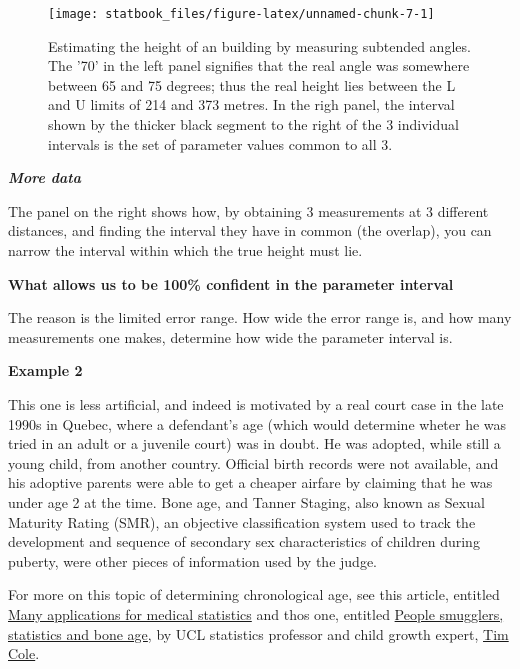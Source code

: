 \documentclass[]{book}
\begin{document}
\begin{figure}

{\centering \texttt{[image: statbook\_files/figure-latex/unnamed-chunk-7-1]} 

}

\caption{Estimating the height of an building by measuring subtended angles. The '70' in the left panel signifies that the real angle was somewhere between 65 and 75 degrees; thus the real height lies between the L and U limits of 214 and 373 metres. In the righ panel, the  interval shown by the thicker black segment to the right of the 3 individual intervals is the  set of parameter values common to all 3.}\label{fig:unnamed-chunk-7}
\end{figure}

\textbf{\emph{More data}}

The panel on the right shows how, by obtaining 3 measurements at 3 different distances, and finding the interval they have in common (the overlap), you can narrow the interval within which the true height must lie.

\textbf{What allows us to be 100\% confident in the parameter interval}

The reason is the limited error range. How wide the error range is, and how many measurements one makes, determine how wide the parameter interval is.

\textbf{Example 2}

This one is less artificial, and indeed is motivated by a real court case in the late 1990s in Quebec, where a defendant's age (which would determine wheter he was tried in an adult or a juvenile court) was in doubt. He was adopted, while still a young child, from another country. Official birth records were not available, and his adoptive parents were able to get a cheaper airfare by claiming that he was under age 2 at the time. Bone age, and Tanner Staging, also known as Sexual Maturity Rating (SMR), an objective classification system used to track the development and sequence of secondary sex characteristics of children during puberty, were other pieces of information used by the judge.

For more on this topic of determining chronological age, see this article, entitled \href{https://discovery.ucl.ac.uk/id/eprint/1470308/1/Tim_Cole_Intl_Innovation_140_Research_Media.pdf}{Many applications for medical statistics} and thos one, entitled \href{https://rss.onlinelibrary.wiley.com/doi/full/10.1111/j.1740-9713.2012.00568.x}{People smugglers, statistics and bone age}, by UCL statistics professor and child growth expert, \href{https://scholar.google.com/citations?user=1P_yQocAAAAJ\&hl=en}{Tim Cole}.
\end{document}
